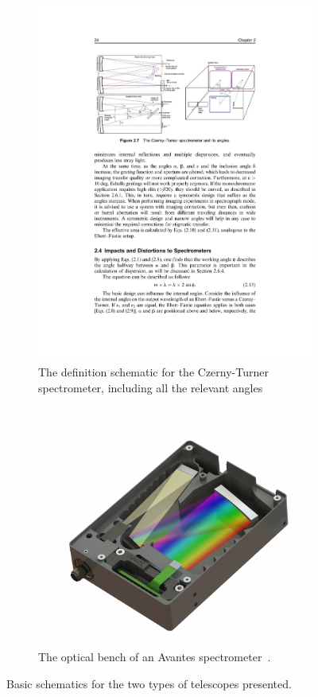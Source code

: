 \begin{figure}
    \centering
      \begin{subfigure}[a]{.8\linewidth}
        \centering
        \includegraphics[clip,%
        trim=3.7cm 17.5cm 3.7cm 3.7cm,%
        width=.8\textwidth]{img/pdf/neumannCzernyTurner.pdf}
        \caption{The definition schematic for the Czerny-Turner
        spectrometer, including all the relevant
        angles~\cite{Neumann2014}}\label{fig:czernyturner}
      \end{subfigure}%
      \\
      \begin{subfigure}[b]{.6\linewidth}
        \centering
        \includegraphics[width=.8\textwidth]{img/png/Open-Bench-V2.png}
        \caption{The optical bench of an Avantes
        spectrometer~\cite{Avantes2022}.}\label{fig:avantes_3d}
      \end{subfigure}
      \caption{Basic schematics for the two types of telescopes
      presented.}\label{fig:telescope_types_schematics}
\end{figure}

